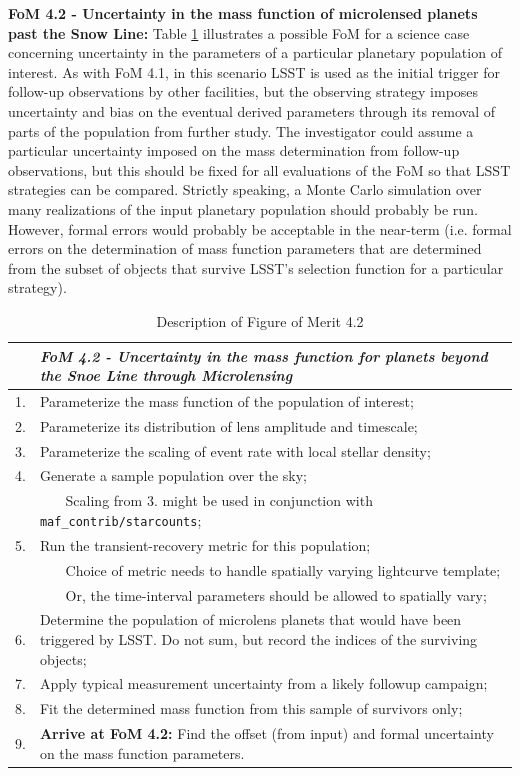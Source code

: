 {\bf FoM 4.2 - Uncertainty in the mass function of microlensed planets
  past the Snow Line:} Table \ref{table:pseudoFOM_4p2}
  illustrates a possible FoM for a science case concerning uncertainty
  in the parameters of a particular planetary population of
  interest. As with FoM 4.1, in this scenario LSST is used as the
  initial trigger for follow-up observations by other facilities, but
  the observing strategy imposes uncertainty and bias on the eventual
  derived parameters through its removal of parts of the population
  from further study. The investigator could assume a particular
  uncertainty imposed on the mass determination from follow-up
  observations, but this should be fixed for all evaluations of the
  FoM so that LSST strategies can be compared. Strictly speaking, a
  Monte Carlo simulation over many realizations of the input planetary
  population should probably be run. However, formal errors would
  probably be acceptable in the near-term (i.e. formal errors on the
  determination of mass function parameters that are determined from
  the subset of objects that survive LSST's selection function for a
  particular strategy).

\begin{table}[h]
  \small
  \begin{tabular}{c p{12cm}}
    & {\it FoM 4.2 - Uncertainty in the mass function for planets beyond the Snoe Line through Microlensing}\\
    \hline
  1. & Parameterize the mass function of the population of interest;\\
  2. & Parameterize its distribution of lens amplitude and timescale;\\
  3. & Parameterize the scaling of event rate with local stellar density;\\
  4. & Generate a sample population over the sky; \\
     & ~~~ Scaling from 3. might be used in conjunction with {\tt maf\_contrib/starcounts}; \\
  5. & Run the transient-recovery metric for this population; \\
     & ~~~ Choice of metric needs to handle spatially varying lightcurve template; \\
     & ~~~ Or, the time-interval parameters should be allowed to spatially vary; \\
  6. & Determine the population of microlens planets that would have been triggered by LSST. Do not sum, but record the indices of the surviving objects; \\
  7. & Apply typical measurement uncertainty from a likely followup campaign; \\
  8. & Fit the determined mass function from this sample of survivors only; \\
  9. & {\bf Arrive at FoM 4.2:} Find the offset (from input) and formal uncertainty on the mass function parameters.\\
\hline
    \end{tabular}
 \caption{Description of Figure of Merit 4.2}
  \label{table:pseudoFOM_4p2}
\end{table}


